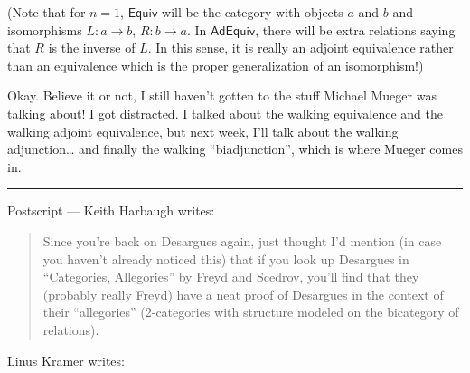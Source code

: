 \documentclass{article}
\begin{document}
(Note that for \(n = 1\), \(\mathsf{Equiv}\) will be the category with
objects \(a\) and \(b\) and isomorphisms \(L\colon a \to b\),
\(R\colon b \to a\). In \(\mathsf{AdEquiv}\), there will be extra
relations saying that \(R\) is the inverse of \(L\). In this sense, it
is really an adjoint equivalence rather than an equivalence which is the
proper generalization of an isomorphism!)

Okay. Believe it or not, I still haven't gotten to the stuff Michael
Mueger was talking about! I got distracted. I talked about the walking
equivalence and the walking adjoint equivalence, but next week, I'll
talk about the walking adjunction\ldots{} and finally the walking
``biadjunction'', which is where Mueger comes in.

\begin{center}\rule{0.5\linewidth}{0.5pt}\end{center}

Postscript --- Keith Harbaugh writes:

\begin{quote}
Since you're back on Desargues again, just thought I'd mention (in case
you haven't already noticed this) that if you look up Desargues in
``Categories, Allegories'' by Freyd and Scedrov, you'll find that they
(probably really Freyd) have a neat proof of Desargues in the context of
their ``allegories'' (\(2\)-categories with structure modeled on the
bicategory of relations).
\end{quote}

Linus Kramer writes:
\end{document}
